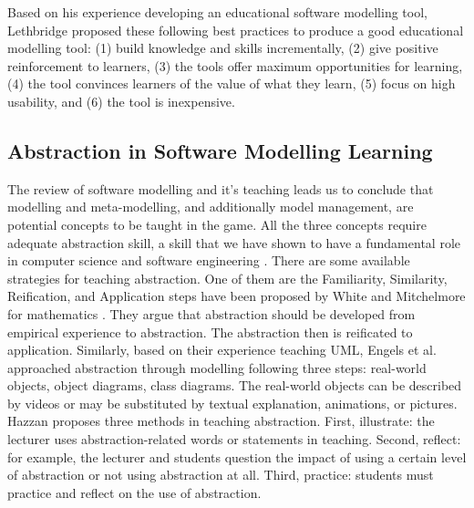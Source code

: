 \documentclass[12pt, a4paper]{report}
\begin{document}
{Based on his experience developing an educational software modelling tool, Lethbridge \cite{lethbridge2014teaching} proposed these following best practices to produce  a good educational modelling tool: (1) build knowledge and skills incrementally, (2) give positive reinforcement to learners, (3) the tools offer maximum opportunities for learning, (4) the tool convinces learners of the value of what they learn, (5) focus on high usability, and (6) the tool is inexpensive.

\subsection{Abstraction in Software Modelling Learning}
\label{Abstraction in Software Modelling Learning}
The review of software modelling and it's teaching leads us to conclude that modelling and meta-modelling, and additionally model management, are potential concepts to be taught in the game. All the three concepts require adequate abstraction skill, a skill that we have shown to have a fundamental role in computer science and software engineering \cite{engels2005teaching, Kramer2007, hazzan2008reflections}. There are some available strategies for teaching abstraction. One of them are the Familiarity, Similarity, Reification, and Application steps have been proposed by White and Mitchelmore for mathematics \cite{white2010teaching}. They argue that abstraction should be developed from empirical experience to abstraction. The abstraction then is reificated to application. Similarly, based on their experience teaching UML, Engels et al. \cite{engels2005teaching} approached abstraction through modelling following three steps: real-world objects, object diagrams, class diagrams. The real-world objects can be described by videos or may be substituted by textual explanation, animations, or pictures. Hazzan \cite{hazzan2008reflections} proposes three methods in teaching abstraction. First, illustrate: the lecturer uses abstraction-related words or statements in teaching. Second, reflect: for example, the lecturer and students question the impact of using a certain level of abstraction or not using abstraction at all. Third, practice: students must practice and reflect on the use of abstraction.

}
\end{document}
